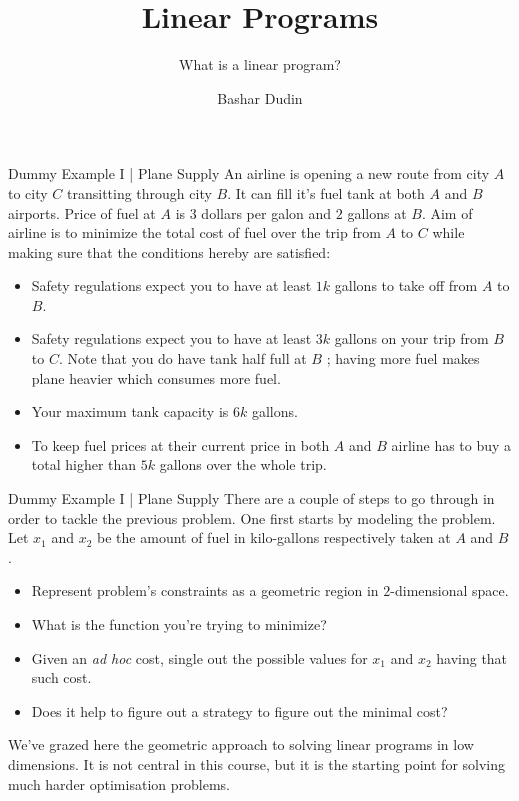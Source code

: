 \documentclass[aspectratio = 169]{beamer}
\author[BD]{Bashar Dudin}
\institute[]{EPITA}
\title{Linear Programs} %
\subtitle{What is a linear program?}
\begin{document}
\begin{frame}[plain]
\titlepage %
\end{frame}


\begin{frame}{Dummy Example I | Plane Supply}
  An airline is opening a new route from city $A$ to city $C$
  transitting through city $B$. It can fill it's fuel tank at both
  $A$ and $B$ airports. Price of fuel at $A$ is $3$ dollars per
  galon and $2$ gallons at $B$. Aim of airline is to minimize the
  total cost of fuel over the trip from $A$ to $C$ while making sure
  that the conditions hereby are satisfied:
  \begin{itemize}
  \item<2-> Safety regulations expect you to have at least $1k$
    gallons to take off from $A$ to $B$.
  \item<3-> Safety regulations expect you to have at least $3k$
    gallons on your trip from $B$ to $C$. Note that you do have tank
    half full at $B$ ; having more fuel makes plane heavier which
    consumes more fuel.
  \item<4-> Your maximum tank capacity is $6k$ gallons.
  \item<5-> To keep fuel prices at their current price in both $A$
    and $B$ airline has to buy a total higher than $5k$ gallons over
    the whole trip.
  \end{itemize}
\end{frame}

\begin{frame}{Dummy Example I | Plane Supply}
  There are a couple of steps to go through in order to tackle the
  previous problem. One first starts by modeling the problem. Let
  $x_1$ and $x_2$ be the amount of fuel in kilo-gallons respectively
  taken at $A$ and $B$.
  \begin{itemize}
  \item Represent problem's constraints as a geometric region in
    $2$-dimensional space.
  \item What is the function you're trying to minimize?
  \item Given an \textit{ad hoc} cost, single out the possible values
    for $x_1$ and $x_2$ having that such cost.
  \item Does it help to figure out a strategy to figure out the
    minimal cost?
  \end{itemize}
  \pause We've grazed here the geometric approach to solving linear
  programs in low dimensions. It is not central in this course, but it
  is the starting point for solving much harder optimisation problems.
\end{frame}
\end{document}
